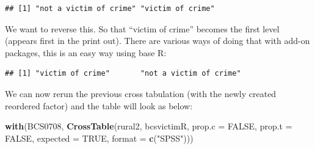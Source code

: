 \documentclass[]{book}
\newenvironment{Shaded}{\begin{snugshade}}{\end{snugshade}}
\newcommand{\DataTypeTok}[1]{\textcolor[rgb]{0.13,0.29,0.53}{#1}}
\newcommand{\KeywordTok}[1]{\textcolor[rgb]{0.13,0.29,0.53}{\textbf{#1}}}
\newcommand{\NormalTok}[1]{#1}
\newcommand{\OperatorTok}[1]{\textcolor[rgb]{0.81,0.36,0.00}{\textbf{#1}}}
\newcommand{\OtherTok}[1]{\textcolor[rgb]{0.56,0.35,0.01}{#1}}
\newcommand{\StringTok}[1]{\textcolor[rgb]{0.31,0.60,0.02}{#1}}
\theoremstyle{definition}
\theoremstyle{definition}
\theoremstyle{definition}
\theoremstyle{remark}
\begin{document}
\begin{Shaded}
\end{Shaded}

\begin{verbatim}
## [1] "not a victim of crime" "victim of crime"
\end{verbatim}

We want to reverse this. So that ``victim of crime'' becomes the first
level (appears first in the print out). There are various ways of doing
that with add-on packages, this is an easy way using base R:

\begin{Shaded}
\end{Shaded}

\begin{verbatim}
## [1] "victim of crime"       "not a victim of crime"
\end{verbatim}

We can now rerun the previous cross tabulation (with the newly created
reordered factor) and the table will look as below:

\begin{Shaded}
\begin{Highlighting}[]
\KeywordTok{with}\NormalTok{(BCS0708, }\KeywordTok{CrossTable}\NormalTok{(rural2, bcsvictimR, }\DataTypeTok{prop.c =} \OtherTok{FALSE}\NormalTok{, }\DataTypeTok{prop.t =} \OtherTok{FALSE}\NormalTok{, }\DataTypeTok{expected =} \OtherTok{TRUE}\NormalTok{, }\DataTypeTok{format =} \KeywordTok{c}\NormalTok{(}\StringTok{"SPSS"}\NormalTok{)))}
\end{Highlighting}
\end{Shaded}
\end{document}
